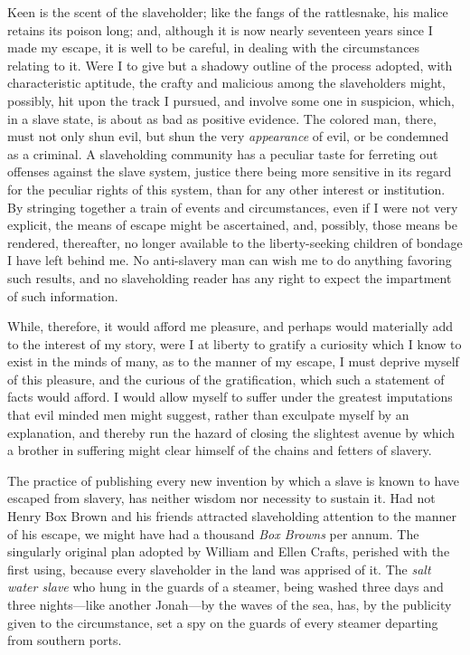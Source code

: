Keen is the scent of the slaveholder; like the fangs of the rattlesnake,
his malice retains its poison long; and, although it is now nearly
seventeen years since I made my escape, it is well to be careful, in
dealing with the circumstances relating to it. Were I to give but a
shadowy outline of the process adopted, with characteristic aptitude,
the crafty and malicious among the slaveholders might, possibly, hit
upon the track I pursued, and involve some one in suspicion, which, in a
slave state, is about as bad as positive evidence. The colored man,
there, must not only shun evil, but shun the very \emph{appearance} of
evil, or be condemned as a criminal. A slaveholding community has a
peculiar taste for ferreting out offenses against the slave system,
justice there being more sensitive in its regard for the peculiar rights
of this system, than for any other interest or institution. By stringing
together a train of events and circumstances, even if I were not very
explicit, the means of escape might be ascertained, and, possibly, those
means be rendered, thereafter, no longer available to the
liberty-seeking children of bondage I have left behind me. No
anti-slavery man can wish me to do anything favoring such results, and
no slaveholding reader has any right to expect the impartment of such
information.

While, therefore, it would afford me pleasure, and perhaps would
materially add to the interest of my {}story, were I at liberty to
gratify a curiosity which I know to exist in the minds of many, as to
the manner of my escape, I must deprive myself of this pleasure, and the
curious of the gratification, which such a statement of facts would
afford. I would allow myself to suffer under the greatest imputations
that evil minded men might suggest, rather than exculpate myself by an
explanation, and thereby run the hazard of closing the slightest avenue
by which a brother in suffering might clear himself of the chains and
fetters of slavery.

The practice of publishing every new invention by which a slave is known
to have escaped from slavery, has neither wisdom nor necessity to
sustain it. Had not Henry Box Brown and his friends attracted
slaveholding attention to the manner of his escape, we might have had a
thousand \emph{Box Browns} per annum. The singularly original plan
adopted by William and Ellen Crafts, perished with the first using,
because every slaveholder in the land was apprised of it. The \emph{salt
water slave} who hung in the guards of a steamer, being washed three
days and three nights---like another Jonah---by the waves of the sea,
has, by the publicity given to the circumstance, set a spy on the guards
of every steamer departing from southern ports.


